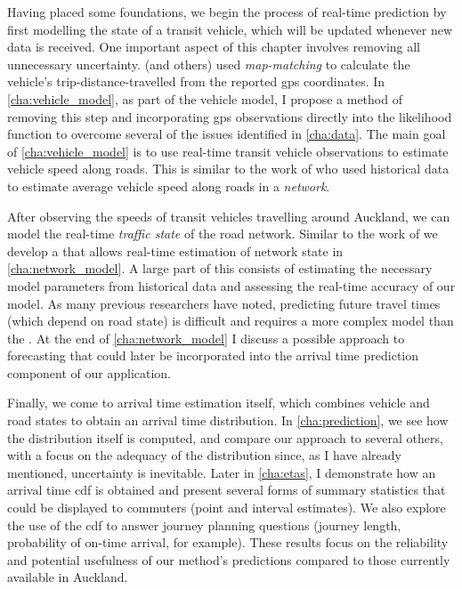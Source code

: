 Having placed some foundations, we begin the process of real-time prediction by first modelling the state of a transit vehicle, which will be updated whenever new data is received. One important aspect of this chapter involves removing all unnecessary uncertainty.  (and others) used \emph{map-matching} to calculate the vehicle's trip-distance-travelled from the reported \gls{gps} coordinates. In \cref{cha:vehicle_model}, as part of the vehicle model, I propose a method of removing this step and incorporating \gls{gps} observations directly into the likelihood function to overcome several of the issues identified in \cref{cha:data}. The main goal of \cref{cha:vehicle_model} is to use real-time transit vehicle observations to estimate vehicle speed along roads. This is similar to the work of \citet{Celan_2017,Celan_2018} who used historical data to estimate average vehicle speed along roads in a \emph{network}.


After observing the speeds of transit vehicles travelling around Auckland, we can model the real-time \emph{traffic state} of the road network. Similar to the work of \citet{Shalaby_2004} we develop a \kf{} that allows real-time estimation of network state in \cref{cha:network_model}. A large part of this consists of estimating the necessary model parameters from historical data and assessing the real-time accuracy of our model. As many previous researchers have noted, predicting future travel times (which depend on road state) is difficult and requires a more complex model than the \kf{}. At the end of \cref{cha:network_model} I discuss a possible approach to forecasting that could later be incorporated into the arrival time prediction component of our application.


Finally, we come to arrival time estimation itself, which combines vehicle and road states to obtain an arrival time distribution. In \cref{cha:prediction}, we see how the distribution itself is computed, and compare our approach to several others, with a focus on the adequacy of the distribution since, as I have already mentioned, uncertainty is inevitable. Later in \cref{cha:etas}, I demonstrate how an arrival time \gls{cdf} is obtained and present several forms of summary statistics that could be displayed to commuters (point and interval estimates).  We also explore the use of the \gls{cdf} to answer journey planning questions (journey length, probability of on-time arrival, for example). These results focus on the reliability and potential usefulness of our method's predictions compared to those currently available in Auckland.



